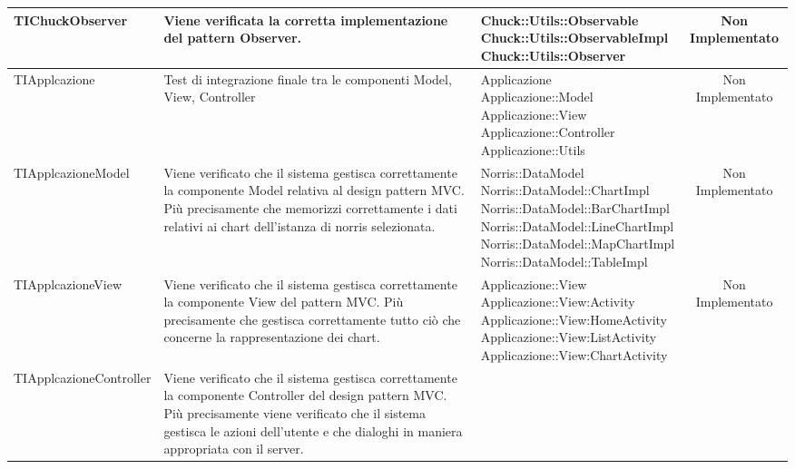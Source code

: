 \begin{table}[H]
\begin{center}
\begin{longtabu}{| X | X | X | c |}
	TIChuckObserver &
Viene verificata la corretta implementazione del pattern Observer.
			& \parbox[t]{0.4\textwidth}{
Chuck::Utils::Observable\\
Chuck::Utils::ObservableImpl\\
Chuck::Utils::Observer}
			& Non Implementato
			\\ \hline










			TIApplcazione &
			Test di integrazione finale tra le componenti Model, View, Controller
			& \parbox[t]{0.4\textwidth}{
			Applicazione\\
			Applicazione::Model\\
			Applicazione::View\\
			Applicazione::Controller\\
			Applicazione::Utils}
			& Non Implementato
\\ \hline
			TIApplcazioneModel &
			Viene verificato che il sistema gestisca correttamente la componente Model relativa al design pattern MVC. Più precisamente che memorizzi correttamente i dati relativi ai chart dell'istanza di norris selezionata.
			& \parbox[t]{0.4\textwidth}{
			Norris::DataModel\\
			Norris::DataModel::ChartImpl\\
			Norris::DataModel::BarChartImpl\\
			Norris::DataModel::LineChartImpl\\
			Norris::DataModel::MapChartImpl\\
			Norris::DataModel::TableImpl}
			& Non Implementato
\\ \hline
			TIApplcazioneView &
			Viene verificato che il sistema gestisca correttamente la componente View del pattern MVC. Più precisamente che gestisca correttamente tutto ciò che concerne la rappresentazione dei chart.
			& \parbox[t]{0.4\textwidth}{
			Applicazione::View\\
			Applicazione::View:Activity\\
			Applicazione::View:HomeActivity\\
			Applicazione::View:ListActivity\\
			Applicazione::View:ChartActivity}
			& Non Implementato
\\ \hline
			TIApplcazioneController &
			Viene verificato che il sistema gestisca correttamente la componente Controller del design pattern MVC. Più precisamente viene verificato che il sistema gestisca le azioni dell’utente e che dialoghi in maniera appropriata con il server.

\end{longtabu}
\end{center}
\end{table}
